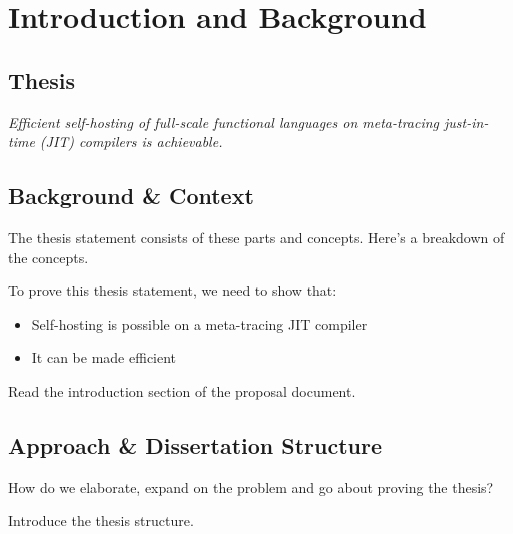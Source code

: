 \chapter{Introduction and Background}

    \section{Thesis}

    \textit{Efficient self-hosting of full-scale functional languages on meta-tracing just-in-time (JIT) compilers is achievable.}


    \section{Background \& Context}

        \begin{mainpoint}

            The thesis statement consists of these parts and concepts. Here's a breakdown of the concepts.

            To prove this thesis statement, we need to show that:
            \begin{itemize}
                \item Self-hosting is possible on a meta-tracing JIT compiler
                \item It can be made efficient
            \end{itemize}

            \begin{todo}
                Read the introduction section of the proposal document.
            \end{todo}

        \end{mainpoint}

    \section{Approach \& Dissertation Structure}

    \begin{mainpoint}

    How do we elaborate, expand on the problem and go about proving the thesis?

    Introduce the thesis structure.
    \end{mainpoint}


